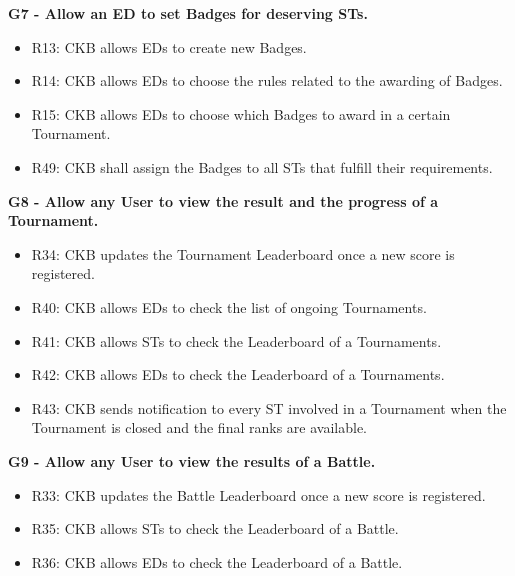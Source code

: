 \vspace{1.5cm}
\textbf{G7 - Allow an ED to set Badges for deserving STs.}
\begin{itemize}
    \item R13: CKB allows EDs to create new Badges.
    \item R14: CKB allows EDs to choose the rules related to the awarding of Badges.
    \item R15: CKB allows EDs to choose which Badges to award in a certain Tournament.
    \item R49: CKB shall assign the Badges to all STs that fulfill their requirements.
\end{itemize}


\vspace{1.5cm}
\textbf{G8 - Allow any User to view the result and the progress of a Tournament.}
\begin{itemize}
    \item R34: CKB updates the Tournament Leaderboard once a new score is registered.
    \item R40: CKB allows EDs to check the list of ongoing Tournaments.
    \item R41: CKB allows STs to check the Leaderboard of a Tournaments.
    \item R42: CKB allows EDs to check the Leaderboard of a Tournaments.
    \item R43: CKB sends notification to every ST involved in a Tournament when the Tournament is closed and the final ranks are available.
\end{itemize}


\vspace{1.5cm}
\textbf{G9 - Allow any User to view the results of a Battle.}
\begin{itemize}
    \item R33: CKB updates the Battle Leaderboard once a new score is registered.
    \item R35: CKB allows STs to check the Leaderboard of a Battle.
    \item R36: CKB allows EDs to check the Leaderboard of a Battle.
\end{itemize}

